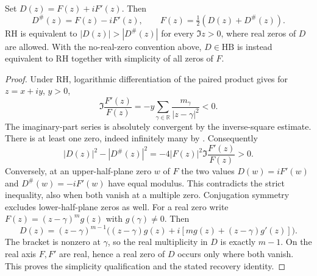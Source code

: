 \begin{theorem}
\label{v4-arith:consumer53:derivative-HB}
Set $D(z)=F(z)+iF'(z)$. Then
\[
 D^\#(z)=F(z)-iF'(z),\qquad
 F(z)=\tfrac12(D(z)+D^\#(z)).
\]
RH is equivalent to $|D(z)|>|D^\#(z)|$ for every $\Im z>0$,
where real zeros of $D$ are allowed. With the no-real-zero convention
above, $D\in\mathrm{HB}$ is instead equivalent to RH together with
simplicity of all zeros of $F$.
\end{theorem}
\begin{proof}
Under RH, logarithmic differentiation of the paired product gives
for $z=x+iy$, $y>0$,
\[
 \Im\frac{F'(z)}{F(z)}
 =-y\sum_{\gamma\in\mathbb R}
           \frac{m_\gamma}{|z-\gamma|^2}<0.
\]
The imaginary-part series is absolutely convergent by the
inverse-square estimate. There is at least one zero, indeed
infinitely many by . Consequently
\[
 |D(z)|^2-|D^\#(z)|^2
 =-4|F(z)|^2\Im\frac{F'(z)}{F(z)}>0.
\]
Conversely, at an upper-half-plane zero $w$ of $F$ the two values
$D(w)=iF'(w)$ and $D^\#(w)=-iF'(w)$ have equal modulus.
This contradicts the strict inequality, also when both vanish at a
multiple zero. Conjugation symmetry excludes lower-half-plane zeros
as well.
For a real zero write $F(z)=(z-\gamma)^m g(z)$ with $g(\gamma)\ne0$.
Then
\[
 D(z)=(z-\gamma)^{m-1}
 \bigl((z-\gamma)g(z)+i[m g(z)+(z-\gamma)g'(z)]\bigr).
\]
The bracket is nonzero at $\gamma$, so the real multiplicity in
$D$ is exactly $m-1$. On the real axis $F,F'$ are real, hence a
real zero of $D$ occurs only where both vanish. This proves the
simplicity qualification and the stated recovery identity.
\end{proof}


